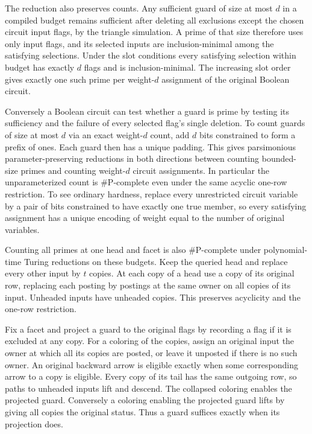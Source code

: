 The reduction also preserves counts. Any sufficient
guard of size at most $d$ in a compiled budget remains
sufficient after deleting all exclusions except the
chosen circuit input flags, by the triangle simulation.
A prime of that size therefore uses only input flags,
and its selected inputs are inclusion-minimal among
the satisfying selections. Under the slot conditions
every satisfying selection within budget has exactly
$d$ flags and is inclusion-minimal. The increasing
slot order gives exactly one such prime per weight-$d$
assignment of the original Boolean circuit.

Conversely a Boolean circuit can test whether a guard
is prime by testing its sufficiency and the failure of
every selected flag's single deletion. To count guards
of size at most $d$ via an exact weight-$d$ count, add
$d$ bits constrained to form a prefix of ones. Each
guard then has a unique padding. This gives parsimonious
parameter-preserving reductions in both directions
between counting bounded-size primes and counting
weight-$d$ circuit assignments. In particular the
unparameterized count is \#P-complete even under the
same acyclic one-row restriction. To see ordinary
hardness, replace every unrestricted circuit variable
by a pair of bits constrained to have exactly one
true member, so every satisfying assignment has a
unique encoding of weight equal to the number of
original variables.

Counting all primes at one head and facet is also
\#P-complete under polynomial-time Turing reductions
on these budgets. Keep the queried head and replace
every other input by $t$ copies. At each copy of a head
use a copy of its original row, replacing each posting
by postings at the same owner on all copies of its
input. Unheaded inputs have unheaded copies. This
preserves acyclicity and the one-row restriction.

Fix a facet and project a guard to the original flags
by recording a flag if it is excluded at any copy.
For a coloring of the copies, assign an original
input the owner at which all its copies are posted,
or leave it unposted if there is no such owner.
An original backward arrow is eligible exactly when
some corresponding arrow to a copy is eligible.
Every copy of its tail has the same outgoing row,
so paths to unheaded inputs lift and descend. The
collapsed coloring enables the projected guard.
Conversely a coloring enabling the projected guard
lifts by giving all copies the original status.
Thus a guard suffices exactly when its projection does.

